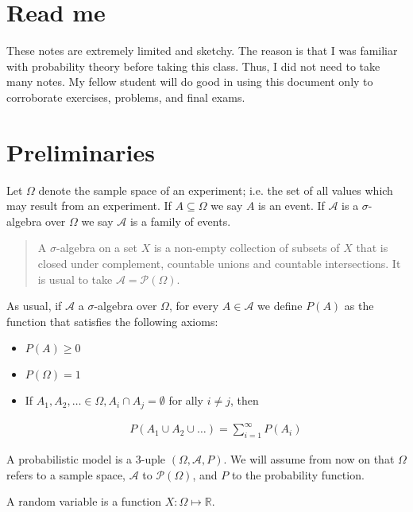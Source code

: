 \documentclass[a4paper, 12pt]{article}
\begin{document}
\section{Read me}

These notes are extremely limited and sketchy. The reason is that I was familiar
with probability theory before taking this class. Thus, I did not need to take
many notes. My fellow student will do good in using this document only to
corroborate exercises, problems, and final exams. 

\section{Preliminaries}

Let $\Omega$ denote the sample space of an experiment; i.e. the set of all
values which may result from an experiment. If $A \subseteq \Omega$ we say $A$
is an event. If $\mathcal{A}$ is a $\sigma$-algebra over $\Omega$ we say
$\mathcal{A}$ is a family of events. 

\begin{quote}
    A $\sigma$-algebra on a set $X$ is a non-empty collection of subsets of $X$
    that is closed under complement, countable unions and countable
    intersections. It is usual to take $\mathcal{A} = \mathcal{P}(\Omega)$.
\end{quote}

As usual, if $\mathcal{A}$ a $\sigma$-algebra over $\Omega$, for every $A \in
\mathcal{A}$ we define $P(A)$ as the function that satisfies the following
axioms: 

\begin{itemize}
    \item $P(A) \geq 0$ 
    \item $P(\Omega) = 1$ 
    \item If $A_1, A_2, \ldots \in \Omega, A_i \cap A_j = \emptyset$  for ally
        $i \neq j$, then 

        \begin{align*}
            P(A_1 \cup A_2 \cup  \ldots) = \sum_{i=1}^{\infty} P(A_i)
        \end{align*}
\end{itemize}

A probabilistic model is a 3-uple $(\Omega, \mathcal{A}, P)$. We will assume
from now on that $\Omega$ refers to a sample space, $\mathcal{A}$ to
$\mathcal{P}(\Omega)$, and $P$ to the probability function.

A random variable is a function $X : \Omega \mapsto \mathbb{R}$.
\end{document}
